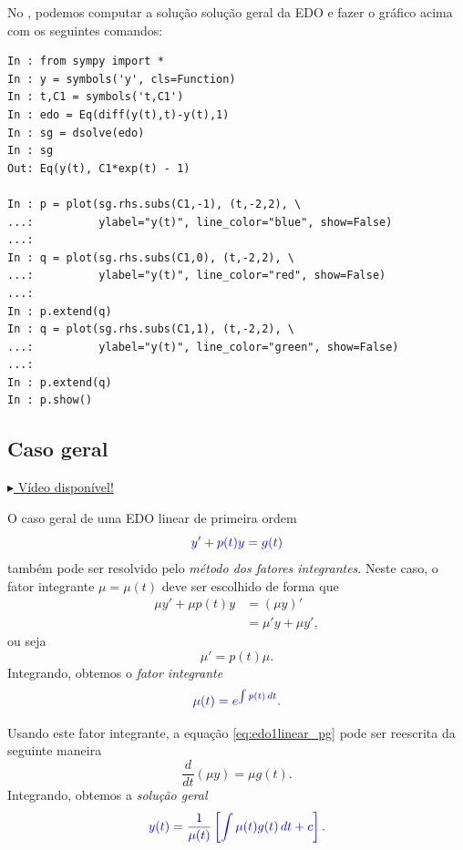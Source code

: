 \begin{ex}
  \ifispython
  No \python, podemos computar a solução solução geral da EDO e fazer o gráfico acima com os seguintes comandos:
\begin{verbatim}
In : from sympy import *
In : y = symbols('y', cls=Function)
In : t,C1 = symbols('t,C1')
In : edo = Eq(diff(y(t),t)-y(t),1)
In : sg = dsolve(edo)
In : sg
Out: Eq(y(t), C1*exp(t) - 1)

In : p = plot(sg.rhs.subs(C1,-1), (t,-2,2), \
...:          ylabel="y(t)", line_color="blue", show=False)
...: 
In : q = plot(sg.rhs.subs(C1,0), (t,-2,2), \
...:          ylabel="y(t)", line_color="red", show=False)
...: 
In : p.extend(q)
In : q = plot(sg.rhs.subs(C1,1), (t,-2,2), \
...:          ylabel="y(t)", line_color="green", show=False)
...: 
In : p.extend(q)
In : p.show()
\end{verbatim}
  \fi
\end{ex}

\subsection{Caso geral}

\begin{flushright}
  \href{https://archive.org/details/edo-ordem-1-linear}{$\blacktriangleright$ Vídeo disponível!}
\end{flushright}

O caso geral de uma EDO linear de primeira ordem
\begin{equation}\label{eq:edo1linear_pg}
  \color{blue}{y' + p(t)y = g(t)}
\end{equation}
também pode ser resolvido pelo \emph{método dos fatores integrantes}. Neste caso, o fator integrante $\mu = \mu(t)$ deve ser escolhido de forma que
\begin{align}
  \mu y' + \mu p(t) y &= (\mu y)' \\
                      &= \mu' y + \mu y',
\end{align}
ou seja
\begin{equation}
  \mu' = p(t)\mu.
\end{equation}
Integrando, obtemos o \emph{fator integrante}
\begin{equation}
  \color{blue}{\mu(t) = e^{\int p(t)\,dt}.}
\end{equation}

Usando este fator integrante, a equação \eqref{eq:edo1linear_pg} pode ser reescrita da seguinte maneira
\begin{equation}
  \frac{d}{dt}\left(\mu y\right) = \mu g(t).
\end{equation}
Integrando, obtemos a \emph{solução geral}
\begin{equation}
  \color{blue}{y(t) = \frac{1}{\mu(t)}\left[\int \mu(t) g(t)\,dt + c\right].}
\end{equation}

